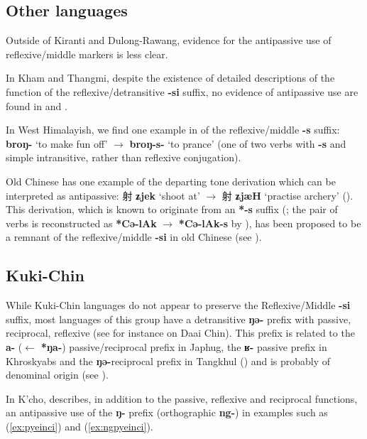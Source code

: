 \documentclass[oneside,a4paper,11pt]{article}
\newcommand{\ipa}[1]{{\phon\textbf{#1}}}
\newcommand{\zh}[1]{{\cn #1}}
\begin{document}
  \subsection{Other languages} \label{sec:other.refl}
  Outside of Kiranti and Dulong-Rawang, evidence for the antipassive use of reflexive/middle markers is less clear.
  
 In Kham and Thangmi, despite the existence of detailed descriptions of the function of the reflexive/detransitive \ipa{-si} suffix, no evidence of antipassive use are found in \citet[105;240-7]{watters02grammar} and \citet[372-6]{turin12thangmi}.
 
 In West Himalayish, we find one example in \citet[452;466]{widmer14bunan} of the reflexive/middle \ipa{-s} suffix: \ipa{broŋ-} `to make fun off' $\rightarrow$ \ipa{broŋ-s-} `to prance' (one of two verbs with \ipa{-s} and simple intransitive, rather than reflexive conjugation).
 

Old Chinese has one example of the departing tone derivation which can be interpreted as antipassive: \zh{射} \ipa{ʑjek} `shoot at' $\rightarrow$ \zh{射} \ipa{ʑjæH} `practise archery' (\citealt[288]{downer59}). This derivation, which is known to originate from an \ipa{*-s} suffix (\citealt{haudricourt54chinois}; the pair of verbs is reconstructed as  \ipa{*Cə-lAk} $\rightarrow$ \ipa{*Cə-lAk-s} by \citealt{bs14oc}), has been proposed to be a remnant of the reflexive/middle \ipa{-si} in old Chinese (see \citealt{jacques16ssuffixes}).


\subsection{Kuki-Chin} \label{sec:kc}
While Kuki-Chin languages do not appear to preserve the Reflexive/Middle \ipa{-si} suffix, most languages of this group have a detransitive \ipa{ŋə-} prefix with passive, reciprocal, reflexive (see for instance \citealt[203-209]{hartmann09grammar} on Daai Chin). This prefix is related to the \ipa{a-} ($\leftarrow$ \ipa{*ŋa-}) passive/reciprocal prefix in Japhug, the \ipa{ʁ-} passive prefix in Khroskyabs and the \ipa{ŋə-}reciprocal prefix in Tangkhul (\citealt[904-5]{jacques07passif}) and is probably of denominal origin (see \citealt{lai18denom}).

In K'cho, \citet[57]{mang06kcho} describes, in addition to the passive, reflexive and reciprocal functions, an antipassive use of the \ipa{ŋ-} prefix (orthographic \ipa{ng-}) in examples such as (\ref{ex:pyeinci}) and (\ref{ex:ngpyeinci}).
\end{document}
